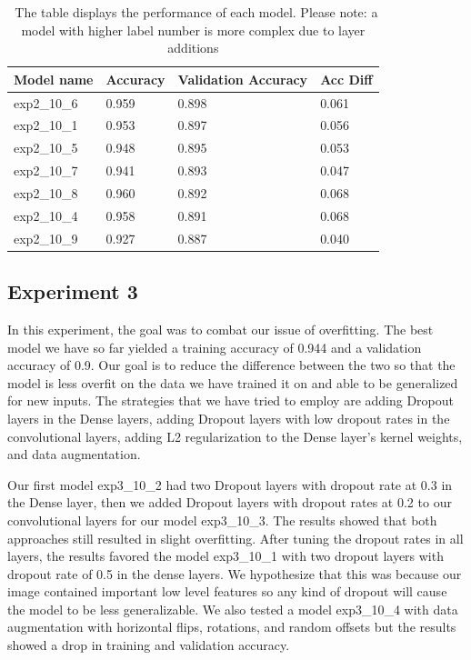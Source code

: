 \documentclass[twoside,twocolumn,9pt]{article}
\begin{document}
\begin{table}[h]
\small
  \caption{\ The table displays the performance of each model.
Please note: a model with higher label number is more complex due to layer additions}
  \label{tbl:example1}
  \begin{tabular*}{0.48\textwidth}{@{\extracolsep{\fill}}llll}
    \hline
    Model name & Accuracy & Validation Accuracy & Acc Diff\\
    \hline
    exp2\_10\_6 & 0.959 & 0.898 & 0.061\\
    exp2\_10\_1 & 0.953 & 0.897 & 0.056\\
    exp2\_10\_5 & 0.948 & 0.895 & 0.053\\
    exp2\_10\_7  & 0.941 & 0.893 & 0.047\\
    exp2\_10\_8  & 0.960 & 0.892 & 0.068\\
    exp2\_10\_4  & 0.958 & 0.891 & 0.068\\
    exp2\_10\_9  & 0.927 & 0.887 & 0.040\\
    \hline
  \end{tabular*}
\end{table}

\subsection{Experiment 3}

In this experiment, the goal was to combat our issue of overfitting. The best model we have so far yielded a training accuracy of 0.944 and a validation accuracy of 0.9. Our goal is to reduce the difference between the two so that the model is less overfit on the data we have trained it on and able to be generalized for new inputs. The strategies that we have tried to employ are adding Dropout layers in the Dense layers, adding Dropout layers with low dropout rates in the convolutional layers, adding L2 regularization to the Dense layer’s kernel weights, and data augmentation. 

\noindent Our first model exp3\_10\_2 had two Dropout layers with dropout rate at 0.3 in the Dense layer, then we added Dropout layers with dropout rates at 0.2 to our convolutional layers for our model exp3\_10\_3. The results showed that both approaches still resulted in slight overfitting. After tuning the dropout rates in all layers, the results favored the model exp3\_10\_1 with two dropout layers with dropout rate of 0.5 in the dense layers. We hypothesize that this was because our image contained important low level features so any kind of dropout will cause the model to be less generalizable. We also tested a model exp3\_10\_4 with data augmentation with horizontal flips, rotations, and random offsets but the results showed a drop in training and validation accuracy. 
\end{document}
